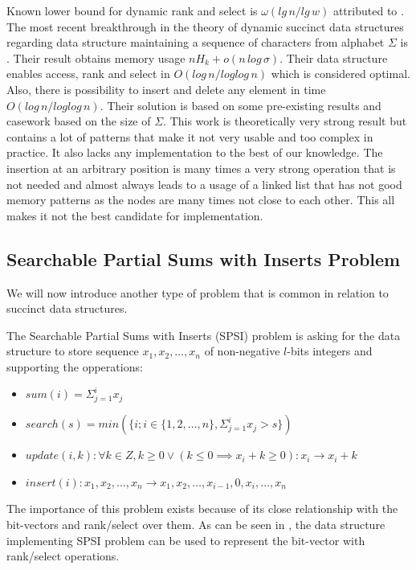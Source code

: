 Known lower bound for dynamic rank and select is $\omega(lg\,n/lg\,w)$ attributed to \cite{beame2002optimal}. The most recent breakthrough in the theory of dynamic succinct data structures regarding data structure maintaining a sequence of characters from alphabet $\Sigma$ is \cite{munro2015compressed}. Their result obtains memory usage $nH_k+o(n\,log\,\sigma)$. Their data structure enables access, rank and select in $O(log\,n/log log\,n)$ which is considered optimal. Also, there is possibility to insert and delete any element in time $O(log\,n/log log\,n)$. Their solution is based on some pre-existing results and casework based on the size of $\Sigma$. This work is theoretically very strong result but contains a lot of patterns that make it not very usable and too complex in practice. It also lacks any implementation to the best of our knowledge. The insertion at an arbitrary position is many times a very strong operation that is not needed and almost always leads to a usage of a linked list that has not good memory patterns as the nodes are many times not close to each other. This all makes it not the best candidate for implementation.

\subsection{Searchable Partial Sums with Inserts Problem}

We will now introduce another type of problem that is common in relation to succinct data structures.

\begin{theorem}
The Searchable Partial Sums with Inserts (SPSI) problem is asking for the data structure to
store sequence $x_1, x_2, \ldots , x_n$ of non-negative $l$-bits integers and supporting the opperations:
\begin{itemize}
    \item $sum(i) = \Sigma_{j=1}^{i} x_j$
    \item $search(s) = min(\{i; i\in \{1, 2,\ldots, n\}, \Sigma_{j=1}^{i} x_j > s \})$
    \item $update(i, k): \forall k \in Z, k \geq 0 \lor (k\leq 0 \implies x_i + k \geq 0): x_i \rightarrow x_i + k$
    \item $insert(i): x_1, x_2,\ldots, x_n \rightarrow x_1, x_2,\ldots , x_{i-1}, 0, x_{i}, \ldots , x_n$
\end{itemize}
\end{theorem}

The importance of this problem exists because of its close relationship with the bit-vectors and rank/select over them.
As can be seen in \cite{prezza2017framework}, the data structure implementing SPSI problem can be used to represent the bit-vector with rank/select operations.

